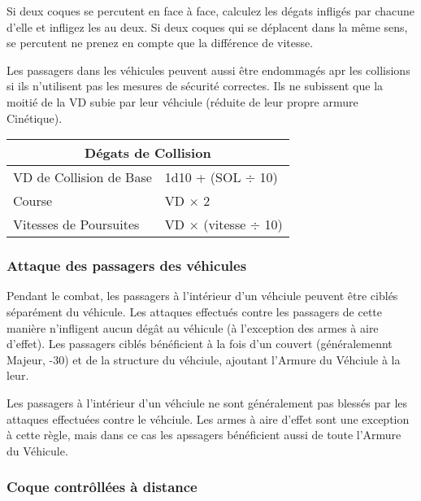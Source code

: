 Si deux coques se percutent en face à face, calculez les dégats infligés par chacune d'elle et infligez les au deux. Si deux coques qui se déplacent dans la même sens, se percutent ne prenez en compte que la différence de vitesse. 

Les passagers dans les véhicules peuvent aussi être endommagés apr les collisions si ils n'utilisent pas les mesures de sécurité correctes. Ils ne subissent que la moitié de la VD subie par leur véhciule (réduite de leur propre armure Cinétique). 

\begin{table} \begin{tabular}{|l|l|} \hline

\multicolumn{2}{|c|}{\textbf{Dégats de Collision}}	\\ \hline

VD de Collision de Base	&1d10 + (SOL $\div$ 10)	\\ \hline

Course	&VD $\times$ 2	\\ \hline

Vitesses de Poursuites	&VD $\times$ (vitesse $\div$ 10)	\\ \hline

\end{tabular} \label{tab:collision-damage} \end{table} 

\subsubsection{Attaque des passagers des véhicules} 

Pendant le combat, les passagers à l'intérieur d'un véhciule peuvent être ciblés séparément du véhicule. Les attaques effectués contre les passagers de cette manière n'infligent aucun dégât au véhicule (à l'exception des armes à aire d'effet). Les passagers ciblés bénéficient à la fois d'un couvert (généralemennt Majeur, -30) et de la structure du véhciule, ajoutant l'Armure du Véhciule à la leur. 

Les passagers à l'intérieur d'un véhciule ne sont généralement pas blessés par les attaques effectuées contre le véhciule. Les armes à aire d'effet sont une exception à cette règle, mais dans ce cas les apssagers bénéficient aussi de toute l'Armure du Véhicule. 

\subsubsection{Coque contrôllées à distance} 

